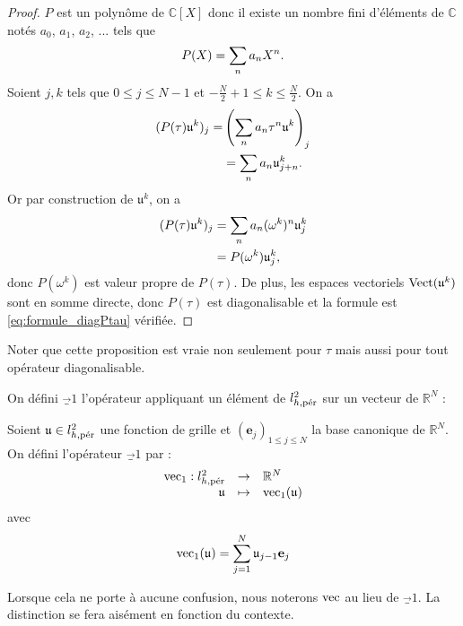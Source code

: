 \begin{proof}
$P$ est un polynôme de $\mathbb{C}[X]$ donc il existe un nombre fini d'éléments de $\mathbb{C}$ notés $a_0$, $a_1$, $a_2$, ... tels que
\begin{equation}
P(X) = \gsum_{n} a_n X^n.
\end{equation}
Soient $j, k$ tels que $0 \leq j \leq N-1$ et $-\frac{N}{2}+1 \leq k \leq \frac{N}{2}$. On a
\begin{align*}
(P(\tau)\mathfrak{u}^k)_j = & \left( \gsum_{n} a_n \tau^n \mathfrak{u}^k  \right)_j\\
	& = \gsum_n a_n \mathfrak{u}^k_{j+n}.
	\end{align*}
Or par construction de $\mathfrak{u}^k$, on a
\begin{align*}	
(P(\tau)\mathfrak{u}^k)_j & = \gsum_{n} a_n (\omega^k)^n \mathfrak{u}_j^k \\
	& = P(\omega^k) \mathfrak{u}_j^k,
\end{align*}
donc $P(\omega^k)$ est valeur propre de $P(\tau)$.
De plus, les espaces vectoriels $\Vect (\mathfrak{u}^k)$ sont en somme directe, donc $P(\tau)$ est diagonalisable et la formule  est \eqref{eq:formule_diagPtau} vérifiée.
\end{proof}

\begin{remarque}
Noter que cette proposition est vraie non seulement pour $\tau$ mais aussi pour tout opérateur diagonalisable.
\end{remarque}

On défini $\vec_1$ l'opérateur appliquant un élément de $l_{h,\per}^2$ sur un vecteur de $\mathbb{R}^N$ :

\begin{definition}
Soient $\mathfrak{u} \in l^2_{h,\per}$ une fonction de grille et $(\mathbf{e}_j)_{1 \leq j \leq N}$ la base canonique de $\mathbb{R}^N$. On défini l'opérateur $\vec_1$ par :
\begin{equation}
\begin{array}{rcl}
\vec_1 : l^2_{h,\per} & \rightarrow & \mathbb{R}^N \\
         \mathfrak{u} & \mapsto & \vec_1 ( \mathfrak{u} )
\end{array}
\end{equation}
avec 
\begin{equation}
\vec_1 (\mathfrak{u} ) = \gsum_{j=1}^N \mathfrak{u}_{j-1} \mathbf{e}_j
\end{equation}
\end{definition}
Lorsque cela ne porte à aucune confusion, nous noterons $\vec$ au lieu de $\vec_1$. La distinction se fera aisément en fonction du contexte.

